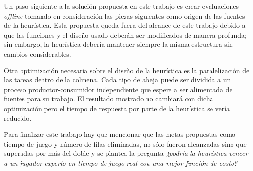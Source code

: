 Un paso siguiente a la solución propuesta en este trabajo es crear 
evaluaciones \textit{offline} tomando en consideración las piezas siguientes 
como origen de las fuentes de la heurística. Esta propuesta queda fuera del 
alcance de este trabajo debido a que las funciones y el diseño usado deberán 
ser modificados de manera profunda; sin embargo, la heurística debería 
mantener siempre la misma estructura sin cambios considerables. 

Otra optimización necesaria sobre el diseño de la heurística es la 
paralelización de las tareas dentro de la colmena. Cada tipo de abeja 
puede ser dividida a un proceso productor-consumidor independiente que 
espere a ser alimentada de fuentes para su trabajo. El resultado 
mostrado no cambiará con dicha optimización pero el tiempo de respuesta 
por parte de la heurística se vería reducido.

Para finalizar este trabajo hay que mencionar que las metas propuestas 
como tiempo de juego y número de filas eliminadas, no sólo fueron alcanzadas 
sino que superadas por más del doble y se plantea la pregunta \textit{¿podría la 
heurística vencer a un jugador experto en tiempo de juego real con una mejor 
función de costo?}